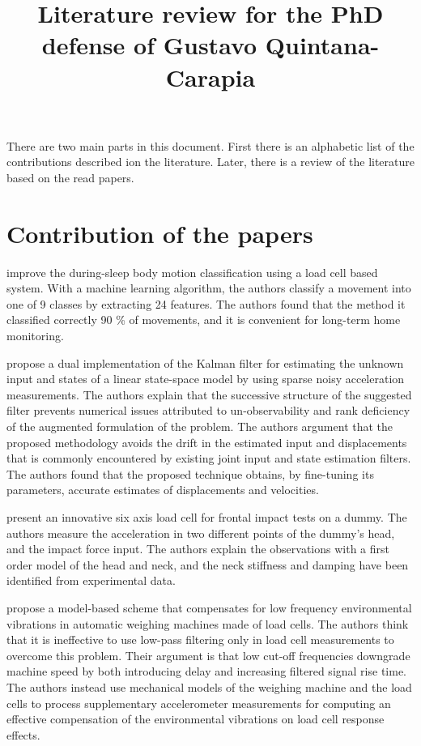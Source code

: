 \documentclass[11pt]{article}
\title{Literature review for the PhD defense of \linebreak Gustavo Quintana-Carapia}
\begin{document}
\maketitle

There are two main parts in this document. 
First there is an alphabetic list of the contributions described ion the literature.
Later, there is a review of the literature based on the read papers.

\section{Contribution of the papers}


\citet{Alaziz17} improve the during-sleep body motion classification using a load cell based system. With a machine learning algorithm, the authors classify a movement into one of 9 classes by extracting 24 features. The authors found that the method it classified correctly 90 \% of movements, and it is convenient for long-term home monitoring.

\citet{Azam15} propose a  dual implementation of the Kalman filter for estimating the unknown input and states of a linear state-space model by using sparse noisy acceleration measurements. The authors explain that the successive structure of the suggested filter prevents numerical issues attributed to un-observability and rank deficiency of the augmented formulation of the problem. The authors argument that the proposed methodology avoids the drift in the estimated input and displacements that is commonly encountered by existing joint input and state estimation filters. The authors found that the proposed technique obtains, by fine-tuning its parameters, accurate estimates of displacements and velocities.

\citet{Ballo16}  present an innovative six axis load cell for frontal impact tests on a dummy.  The authors measure the acceleration in two different points of the dummy's head, and the impact force input. The authors explain the observations with a first order model of the head and neck, and the neck stiffness and damping have been identified from experimental data.

\citet{Beck10}


\citet{Boschetti13} propose a model-based scheme that compensates for low frequency environmental vibrations in automatic weighing machines made of load cells. The authors think that it is ineffective to use low-pass filtering only in load cell measurements to overcome this problem. Their argument is that low cut-off frequencies downgrade machine speed by both introducing delay and increasing filtered signal rise time. The authors instead use mechanical models of the weighing machine and the load cells to process supplementary accelerometer measurements for computing an effective compensation of the environmental vibrations on load cell response effects.
\end{document}

